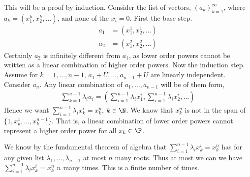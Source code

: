 \documentclass{book}
\begin{document}
\begin{enumerate}[label=\arabic*)]
\begin{enumerate}[label=\alph*)]
          This will be a proof by induction. Consider the list of vectors, $(a_k)_{k = 1}^{\infty}$, where $a_k = (x_1^k, x_2^k, \dots)$, and none of the $x_i = 0$. First the base
          step. 
          \begin{align*}
            a_1 & = (x_1^1, x_2^1, \dots) \\
            a_2 & = (x_1^2, x_2^2, \dots)
          \end{align*}
          Certainly $a_2$ is infinitely different from $a_1$, as lower order powers cannot be written as a linear combination of higher order powers. Now the induction step. Assume for $k =
          1, \dots, n - 1$, $a_1 + U, \dots, a_{n - 1} + U$ are linearly independent. Consider $a_n$. Any linear combination of $a_1, \dots, a_{n - 1}$ will be
          of them form,
          \begin{align*}
            \sum_{k = 1}^{n - 1}\lambda_ia_i = (\sum_{i = 1}^{n - 1}\lambda_ix_1^i, \sum_{i = 1}^{n - 1}\lambda_ix_2^i, \dots)
          \end{align*}
          Hence we want $\sum_{i = 1}^{n - 1}\lambda_ix_k^i = x_k^n$, $k \in \N$. We know that $x_k^n$ is not in the span of $\{1, x_k^1, \dots, x_k^{n - 1}\}$. That is, a linear combination
          of lower order powers cannot represent a higher order power for all $x_k \in \F$. 


          We know by the fundamental theorem of algebra that $\sum_{i = 1}^{n - 1}\lambda_ix_k^i = x_k^n$ has for any given list $\lambda_1, \dots, \lambda_{n - 1}$ at most $n$ many roots.
          Thus at most we can we have $\sum_{i = 1}^{n - 1}\lambda_ix_k^i = x_k^n$ $n$ many times. This is a finite number of times. 



\end{enumerate}
\end{enumerate}
\end{document}
